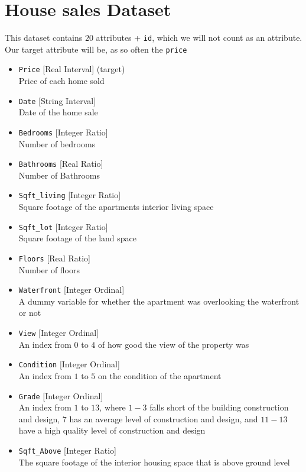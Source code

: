 \documentclass[11pt]{article}
\begin{document}
\section{House sales Dataset}
This dataset contains $20$ attributes + \texttt{id}, which we will not count as an attribute. Our target attribute will be, as so often the \texttt{price}
\begin{multicols}{2}
\begin{itemize}
\item \texttt{Price} [Real Interval] (target) \\
Price of each home sold
\item \texttt{Date} [String Interval]\\
Date of the home sale 
\item \texttt{Bedrooms} [Integer Ratio]\\
Number of bedrooms
\item \texttt{Bathrooms} [Real Ratio]\\
Number of Bathrooms
\item \texttt{Sqft\_living} [Integer Ratio]\\
Square footage of the apartments interior living space
\item \texttt{Sqft\_lot} [Integer Ratio]\\
Square footage of the land space
\item \texttt{Floors} [Real Ratio]\\
Number of floors
\item \texttt{Waterfront} [Integer Ordinal] \\
A dummy variable for whether the apartment was overlooking the waterfront or not
\item \texttt{View} [Integer Ordinal]\\
An index from $0$ to $4$ of how good the view of the property was
\item \texttt{Condition} [Integer Ordinal]\\
An index from $1$ to $5$ on the condition of the apartment
\columnbreak
\item \texttt{Grade} [Integer Ordinal]\\
An index from $1$ to $13$, where $1-3$ falls short of the building construction and design, $7$ has an average level of construction and design, and $11-13$ have a high quality level of construction and design
\item \texttt{Sqft\_Above} [Integer Ratio]\\
The square footage of the interior housing space that is above ground level

\end{itemize}
\end{multicols}
\end{document}
